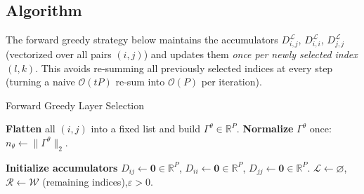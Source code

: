 \subsection{Algorithm}\label{subsec:gls_algo}
The forward greedy strategy below maintains the accumulators
$D^{\mathcal{L}}_{i,j}$, $D^{\mathcal{L}}_{i,i}$, $D^{\mathcal{L}}_{j,j}$ (vectorized over all pairs $(i,j)$) and
updates them \emph{once per newly selected index $(l,k)$}. This avoids re‑summing all previously
selected indices at every step (turning a naive $\mathcal{O}(tP)$ re‑sum into
$\mathcal{O}(P)$ per iteration).
\begin{algorithm}[htb]
\caption{Forward Greedy Layer Selection}
\label{alg:greedy_layer_selection}
\DontPrintSemicolon
{}

\BlankLine
\textbf{Flatten} all $(i,j)$ into a fixed list and build $\Gamma^\theta\in\mathbb{R}^P$.\;
\textbf{Normalize} $\Gamma^\theta$ once: $n_\theta \gets \|\Gamma^\theta\|_2$.\;

\BlankLine
\textbf{Initialize accumulators} $D_{ij} \gets \mathbf{0}\in\mathbb{R}^P$,
$D_{ii} \gets \mathbf{0}\in\mathbb{R}^P$,
$D_{jj} \gets \mathbf{0}\in\mathbb{R}^P$.\;
$\mathcal{L}\gets\varnothing$,\quad $\mathcal{R}\gets\mathcal{W}$ (remaining indices),\quad $\varepsilon>0$.\;


\end{algorithm}
